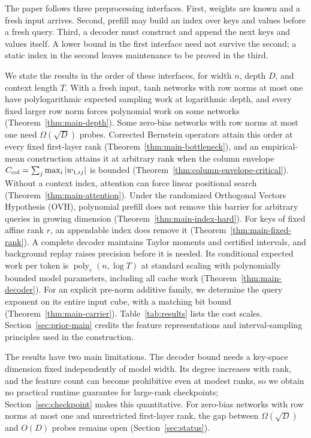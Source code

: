 \documentclass[11pt]{article}
\theoremstyle{definition}
\theoremstyle{remark}
\newcommand{\poly}{\operatorname{poly}}
\numberwithin{equation}{section}
\begin{document}
The paper follows three preprocessing interfaces. First, weights are
known and a fresh input arrives. Second, prefill may build an index
over keys and values before a fresh query. Third, a decoder must
construct and append the next keys and values itself. A lower bound
in the first interface need not survive the second; a static index
in the second leaves maintenance to be proved in the third.

We state the results in the order of these interfaces, for width $n$,
depth $D$, and context length $T$. With a fresh input, tanh networks with row norms at most one have polylogarithmic
expected sampling work at logarithmic depth, and every fixed larger
row norm forces polynomial work on some networks
(Theorem~\ref{thm:main-depth}). Some zero-bias networks with row norms
at most one need $\Omega(\sqrt D)$ probes. Corrected Bernstein operators
attain this order at every fixed first-layer rank
(Theorem~\ref{thm:main-bottleneck}), and an empirical-mean construction
attains it at arbitrary rank when the column envelope
$C_{\rm col}=\sum_j\max_i|w_{1,ij}|$ is bounded
(Theorem~\ref{thm:column-envelope-critical}). Without a context index,
attention can force linear positional search
(Theorem~\ref{thm:main-attention}). Under the randomized Orthogonal Vectors Hypothesis
(OVH), polynomial prefill does not remove this barrier for arbitrary queries in growing
dimension (Theorem~\ref{thm:main-index-hard}). For keys of fixed affine
rank $r$, an appendable index does remove it
(Theorem~\ref{thm:main-fixed-rank}). A complete decoder maintains
Taylor moments and certified intervals, and background replay raises
precision before it is needed. Its conditional expected work per token
is $\poly_r(n,\log T)$ at standard scaling with polynomially bounded
model parameters, including all cache work
(Theorem~\ref{thm:main-decoder}). For an explicit pre-norm additive
family, we determine the query exponent on its entire input cube, with
a matching bit bound (Theorem~\ref{thm:main-carrier}).
Table~\ref{tab:results} lists the cost scales.
Section~\ref{sec:prior-main} credits the feature representations and
interval-sampling principles used in the construction.

The results have two main limitations. The decoder bound needs a
key-space dimension fixed independently of model width. Its degree
increases with rank, and the feature count can become prohibitive even
at modest ranks, so we obtain no practical runtime guarantee for
large-rank checkpoints; Section~\ref{sec:checkpoint} makes this
quantitative. For zero-bias networks with row norms at most one and
unrestricted first-layer rank, the gap between $\Omega(\sqrt D)$ and
$O(D)$ probes remains open (Section~\ref{sec:status}).
\end{document}
